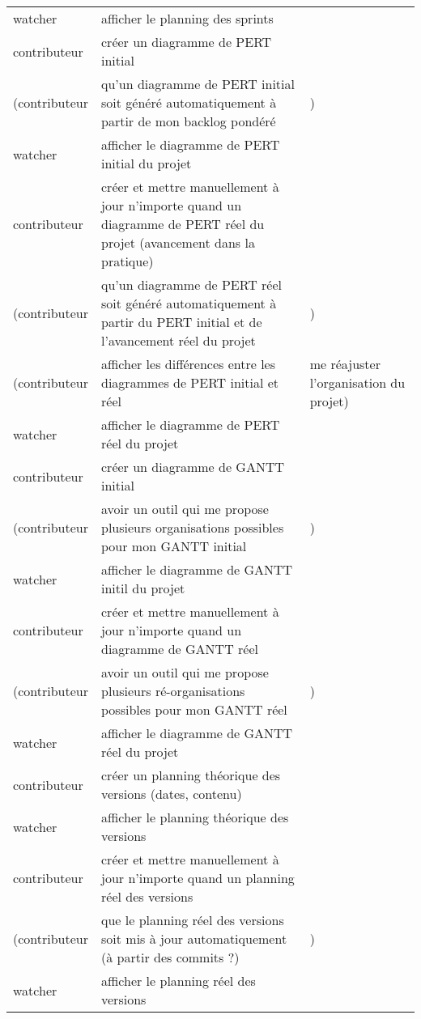 \begin{tabular}{|p{4.2cm}|p{5cm}|p{5cm}|}
watcher & afficher le planning des sprints & \\
contributeur & cr\'eer un diagramme de PERT initial & \\
(contributeur & qu'un diagramme de PERT initial soit g\'en\'er\'e automatiquement \`a partir de mon backlog pond\'er\'e &) \\
watcher & afficher le diagramme de PERT initial du projet & \\
contributeur & cr\'eer et mettre manuellement \`a jour n'importe quand un diagramme de PERT r\'eel du projet (avancement dans la pratique) & \\
(contributeur & qu'un diagramme de PERT r\'eel soit g\'en\'er\'e automatiquement \`a partir du PERT initial et de l'avancement r\'eel du projet & ) \\
(contributeur & afficher les diff\'erences entre les diagrammes de PERT initial et r\'eel & me r\'eajuster l'organisation du projet) \\
watcher & afficher le diagramme de PERT r\'eel du projet & \\
contributeur & cr\'eer un diagramme de GANTT initial & \\
(contributeur & avoir un outil qui me propose plusieurs organisations possibles pour mon GANTT initial & ) \\
watcher & afficher le diagramme de GANTT initil du projet & \\
contributeur & cr\'eer et mettre manuellement \`a jour n'importe quand un diagramme de GANTT r\'eel & \\
(contributeur & avoir un outil qui me propose plusieurs r\'e-organisations possibles pour mon GANTT r\'eel & ) \\
watcher & afficher le diagramme de GANTT r\'eel du projet & \\
contributeur & cr\'eer un planning th\'eorique des versions (dates, contenu) & \\
watcher & afficher le planning th\'eorique des versions & \\
contributeur & cr\'eer et mettre manuellement \`a jour n'importe quand un planning r\'eel des versions & \\
(contributeur & que le planning r\'eel des versions soit mis \`a jour automatiquement (\`a partir des commits ?) & ) \\
watcher & afficher le planning r\'eel des versions & \\






\end{tabular}
